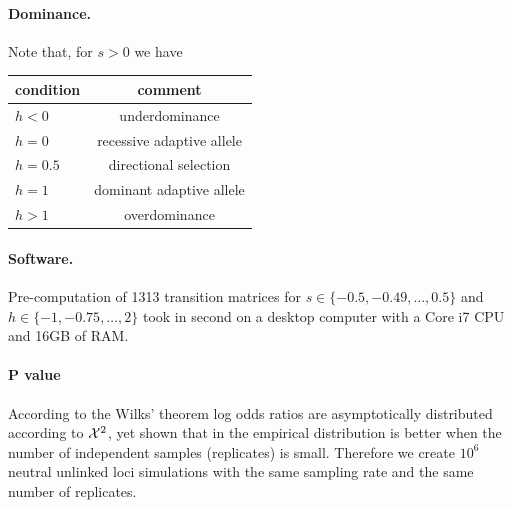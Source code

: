 \documentclass[11pt]{article}
\begin{document}
\paragraph{Dominance.}
Note that, for $s>0$ we have \cite{}  
\begin{center}
	\begin{tabular}{l|c}
		condition & comment\\
		\hline
		$h<0$ &  underdominance\\
		$h=0$ & recessive adaptive allele\\
		$h=0.5$ & directional selection\\
		$h=1$&	dominant adaptive allele	\\
		$h>1$ &overdominance
		\end{tabular}
		\end{center}
		
\paragraph{Software.}
Pre-computation of 1313 transition matrices for $s\in\{-0.5,-0.49,\ldots,0.5 \}$ and $h\in \{-1,-0.75,\ldots,2\}$ took in second on a desktop computer with a Core i7 CPU and 16GB of RAM.


\paragraph{P value}
According to the Wilks’ theorem \cite{}  log odds ratios are asymptotically distributed according to ${\cal X}^2$, yet \cite{feder2014Identifying} shown that in the empirical distribution is better when the number of independent samples (replicates) is small. Therefore we create $10^6$ neutral unlinked loci simulations with the same sampling rate and the same number of replicates.
\end{document}
